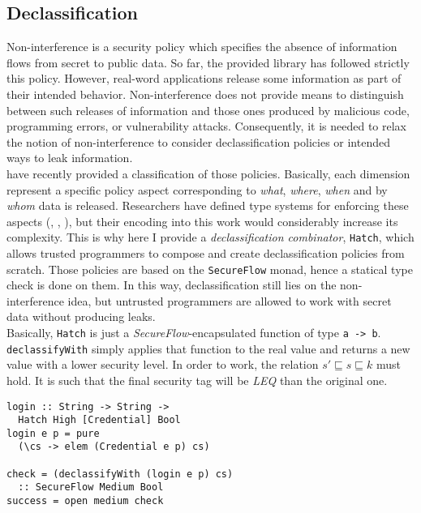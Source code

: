 \subsection{Declassification}
Non-interference is a security policy which specifies the absence of information flows from secret to public data. So far, the provided library has followed strictly this policy. However, real-word applications release some information as part of their intended behavior. Non-interference does not provide means to distinguish between such releases of information and those ones produced by malicious code, programming errors, or vulnerability attacks. Consequently, it is needed to relax the notion of non-interference to consider declassification policies or intended ways to leak information. \\
\citeauthor{sabelfeld2005dimensions} \cite{sabelfeld2005dimensions} have recently provided a classification of those policies. Basically, each dimension represent a specific policy aspect corresponding to \textit{what}, \textit{where}, \textit{when} and by \textit{whom} data is released. Researchers have defined type systems for enforcing these aspects (\cite{banerjee2008expressive}, \cite{zdancewic2001robust}, \cite{zdancewic2003type}), but their encoding into this work would considerably increase its complexity. This is why here I provide a \textit{declassification combinator}, \texttt{Hatch}, which allows trusted programmers to compose and create declassification policies from scratch. Those policies are based on the \texttt{SecureFlow} monad, hence a statical type check is done on them. In this way, declassification still lies on the non-interference idea, but untrusted programmers are allowed to work with secret data without producing leaks.\\
Basically, \texttt{Hatch} is just a \textit{SecureFlow}-encapsulated function of type \texttt{a -> b}. \texttt{declassifyWith} simply applies that function to the real value and returns a new value with a lower security level. In order to work, the relation $s' \sqsubseteq s \sqsubseteq k$ must hold. It is such that the final security tag will be \textit{LEQ} than the original one. 
\begin{lstlisting}[caption={Declassificated login}, label={lst:login}]
login :: String -> String -> 
  Hatch High [Credential] Bool
login e p = pure
  (\cs -> elem (Credential e p) cs)

check = (declassifyWith (login e p) cs)
  :: SecureFlow Medium Bool
success = open medium check
\end{lstlisting}
